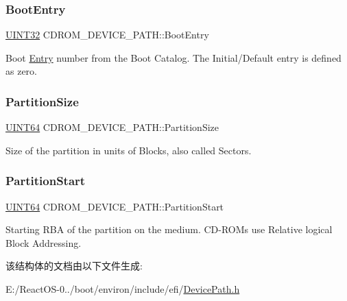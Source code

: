 \subsubsection{\texorpdfstring{Boot\+Entry}{BootEntry}}
{\footnotesize\ttfamily \hyperlink{_processor_bind_8h_ae1e6edbbc26d6fbc71a90190d0266018}{U\+I\+N\+T32} C\+D\+R\+O\+M\+\_\+\+D\+E\+V\+I\+C\+E\+\_\+\+P\+A\+T\+H\+::\+Boot\+Entry}

Boot \hyperlink{struct_entry}{Entry} number from the Boot Catalog. The Initial/\+Default entry is defined as zero. \mbox{\label{struct_c_d_r_o_m___d_e_v_i_c_e___p_a_t_h_ab57c1e0b8f80bec7ee4079ec00df0b69}} 
\subsubsection{\texorpdfstring{Partition\+Size}{PartitionSize}}
{\footnotesize\ttfamily \hyperlink{_processor_bind_8h_a57be03562867144161c1bfee95ca8f7c}{U\+I\+N\+T64} C\+D\+R\+O\+M\+\_\+\+D\+E\+V\+I\+C\+E\+\_\+\+P\+A\+T\+H\+::\+Partition\+Size}

Size of the partition in units of Blocks, also called Sectors. \mbox{\label{struct_c_d_r_o_m___d_e_v_i_c_e___p_a_t_h_a5c6fd80497e4feae215c5ce42e0525b6}} 
\subsubsection{\texorpdfstring{Partition\+Start}{PartitionStart}}
{\footnotesize\ttfamily \hyperlink{_processor_bind_8h_a57be03562867144161c1bfee95ca8f7c}{U\+I\+N\+T64} C\+D\+R\+O\+M\+\_\+\+D\+E\+V\+I\+C\+E\+\_\+\+P\+A\+T\+H\+::\+Partition\+Start}

Starting R\+BA of the partition on the medium. C\+D-\/\+R\+O\+Ms use Relative logical Block Addressing. 

该结构体的文档由以下文件生成\+:\begin{DoxyCompactItemize}
\item 
E\+:/\+React\+O\+S-\/0../boot/environ/include/efi/\hyperlink{_device_path_8h}{Device\+Path.\+h}\end{DoxyCompactItemize}
